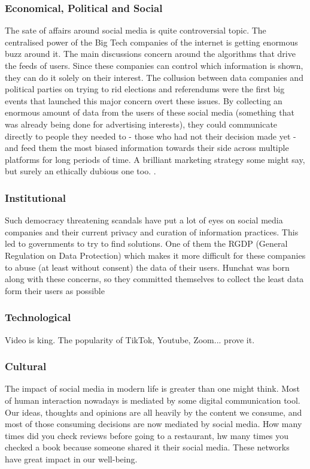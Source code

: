 \documentclass[12pt]{article}
\begin{document}
	\subsubsection{Economical, Political and Social}
	The sate of affairs around social media is quite controversial topic. The centralised power of the Big Tech companies of the internet is getting enormous buzz around it. The main discussions concern around the algorithms that drive the feeds of users. Since these companies can control which information is shown, they can do it solely on their interest. The collusion between data companies and political parties on trying to rid elections and referendums were the first big events that launched this major concern overt these issues. By collecting an enormous amount of data from the users of these social media (something that was already being done for advertising interests), they could communicate directly to people they needed to - those who had not their decision made yet - and feed them the most biased information towards their side across multiple platforms for long periods of time. A brilliant marketing strategy some might say, but surely an ethically dubious one too. .
	
	\subsubsection{Institutional}
	Such democracy threatening scandals have put a lot of eyes on social media companies and their current privacy and curation of information practices. This led to governments to try to find solutions. One of them the RGDP (General Regulation on Data Protection) which makes it more difficult for these companies to abuse (at least without consent) the data of their users. Hunchat was born along with these concerns, so they committed themselves to collect the least data form their users as possible
	
	\subsubsection{Technological}
	Video is king. The popularity of TikTok, Youtube, Zoom... prove it.
	
	\subsubsection{Cultural}
	The impact of social media in modern life is greater than one might think. Most of human interaction nowadays is mediated by some digital communication tool. Our ideas, thoughts and opinions are all heavily by the content we consume, and most of those consuming decisions are now mediated by social media. How many times did you check reviews before going to a restaurant, hw many times you checked a book because someone shared it their social media. These networks have great impact in our well-being.
	
\end{document}
